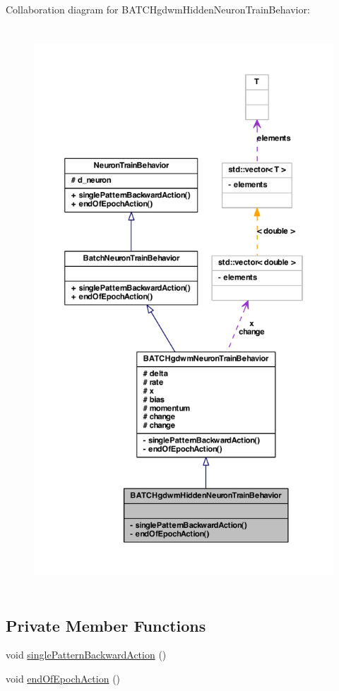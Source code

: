Collaboration diagram for BATCHgdwmHiddenNeuronTrainBehavior:
\nopagebreak
\begin{figure}[H]
\begin{center}
\leavevmode
\includegraphics[height=600pt]{class_b_a_t_c_hgdwm_hidden_neuron_train_behavior__coll__graph}
\end{center}
\end{figure}
\subsection*{Private Member Functions}
\begin{DoxyCompactItemize}
\item 
void \hyperlink{class_b_a_t_c_hgdwm_hidden_neuron_train_behavior_a0119438b8f44461cde1e4d29319c1858}{singlePatternBackwardAction} ()
\item 
void \hyperlink{class_b_a_t_c_hgdwm_hidden_neuron_train_behavior_aecc9be8e5d53a9362d24f5aa32891436}{endOfEpochAction} ()
\end{DoxyCompactItemize}


